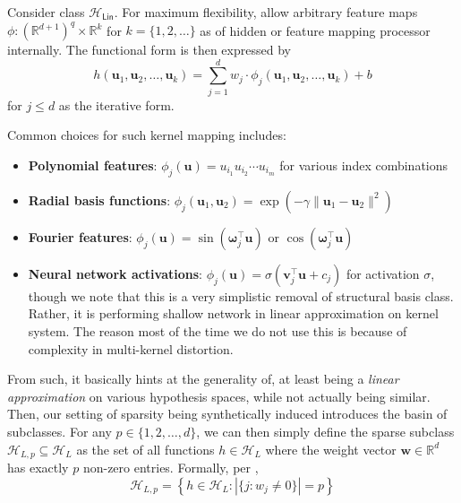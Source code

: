 \begin{definition}
    Consider class $\mathcal{H}_{\mathsf{Lin}}$. For maximum flexibility, allow arbitrary feature maps $\phi: (\mathbb{R}^{d+1})^{q}\times \mathbb{R}^{k}$ for $k=\{1,2,\dots\}$ as of hidden or feature mapping processor internally. The functional form is then expressed by 
    \begin{equation}
            h(\mathbf{u}_1, \mathbf{u}_2, \ldots, \mathbf{u}_k) = \sum_{j=1}^{d} w_j \cdot \phi_j(\mathbf{u}_1, \mathbf{u}_2, \ldots, \mathbf{u}_k) + b
        \end{equation}
        for $j\leq d$ as the iterative form. 
\end{definition}

Common choices for such kernel mapping includes:
\begin{itemize}[topsep=1pt,itemsep=1pt]
    \item \textbf{Polynomial features}: $\phi_j(\mathbf{u}) = u_{i_1} u_{i_2} \cdots u_{i_m}$ for various index combinations
    \item \textbf{Radial basis functions}: $\phi_j(\mathbf{u}_1, \mathbf{u}_2) = \exp(-\gamma \|\mathbf{u}_1 - \mathbf{u}_2\|^2)$
    \item \textbf{Fourier features}: $\phi_j(\mathbf{u}) = \sin(\boldsymbol{\omega}_j^{\top}\mathbf{u})$ or $\cos(\boldsymbol{\omega}_j^{\top}\mathbf{u})$
    \item \textbf{Neural network activations}: $\phi_j(\mathbf{u}) = \sigma(\mathbf{v}_j^{\top}\mathbf{u} + c_j)$ for activation $\sigma$, though we note that this is a very simplistic removal of structural basis class. Rather, it is performing shallow network in linear approximation on kernel system. The reason most of the time we do not use this is because of complexity in multi-kernel distortion. 
\end{itemize}
From such, it basically hints at the generality of, at least being a \textit{linear approximation} on various hypothesis spaces, while not actually being similar. Then, our setting of sparsity being synthetically induced introduces the basin of subclasses. For any $p \in \{1, 2, \ldots, d\}$, we can then simply define the sparse subclass $\mathcal{H}_{L,p} \subseteq \mathcal{H}_{L}$ as the set of all functions $h \in \mathcal{H}_{L}$ where the weight vector $\mathbf{w} \in \mathbb{R}^{d}$ has exactly $p$ non-zero entries. Formally, per \cite{lafon_understanding_2024},
\begin{equation}
        \mathcal{H}_{L,p} = \left\{ h \in \mathcal{H}_{L} : |\{j : w_j \neq 0\}| = p \right\}
\end{equation}
